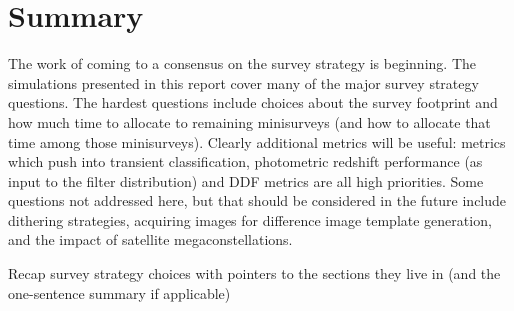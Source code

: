 \section{Summary}

The work of coming to a consensus on the survey strategy is beginning. The simulations presented in this report cover many of the major survey strategy questions. The hardest questions include choices about the survey footprint and how much time to allocate to remaining minisurveys (and how to allocate that time among those minisurveys). Clearly additional metrics will be useful: metrics which push into transient classification, photometric redshift performance (as input to the filter distribution) and DDF metrics are all high priorities. Some questions not addressed here, but that should be considered in the future include dithering strategies, acquiring images for difference image template generation, and the impact of satellite megaconstellations. 

Recap survey strategy choices with pointers to the sections they live in (and the one-sentence summary if applicable)
